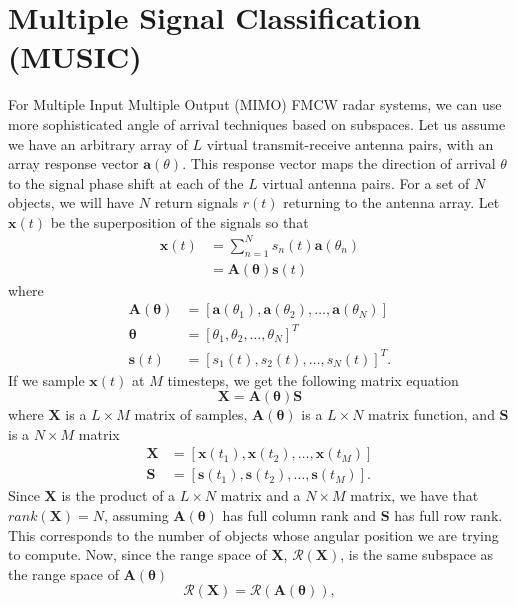 \section{Multiple Signal Classification (MUSIC)}
For Multiple Input Multiple Output (MIMO) FMCW radar systems, we can use more
sophisticated angle of arrival techniques based on subspaces. Let
us assume we have an arbitrary array of $L$ virtual transmit-receive antenna pairs, with an
array response vector $\bm{a}(\theta)$. This response vector maps the direction
of arrival $\theta$ to the signal phase shift at each of the $L$ virtual antenna
pairs. For a set of $N$ objects, we will have $N$ return signals $r(t)$
returning to the antenna array. Let $\bm{x}(t)$ be the superposition of the
signals so that \cite{bresler2017hilbert}
\begin{align}
	\bm{x}(t) &= \sum_{n=1}^N s_n(t) \bm{a}(\theta_n)\\
	&= \bm{A}(\bm{\theta})\bm{s}(t)
\end{align}
where
\begin{align}
	\bm{A}(\bm{\theta}) &= [\bm{a}(\theta_1), \bm{a}(\theta_2), \dots, \bm{a}(\theta_N)]\\
	\bm{\theta} &= [\theta_1, \theta_2, \dots, \theta_N]^T\\
	\bm{s}(t) &= [s_1(t), s_2(t), \dots, s_N(t)]^T.
\end{align}
If we sample $\bm{x}(t)$ at $M$ timesteps, we get the following matrix equation
\begin{equation}
	\bm{X} = \bm{A}(\bm{\theta})\bm{S}
\end{equation}
where $\bm{X}$ is a $L \times M$ matrix of samples, $\bm{A}(\bm{\theta})$ is a
$L\times N$ matrix function, and $\bm{S}$ is a $N\times M$ matrix
\begin{align}
	\bm{X} &= [\bm{x}(t_1), \bm{x}(t_2), \dots, \bm{x}(t_M)]\\
	\bm{S} &= [\bm{s}(t_1), \bm{s}(t_2), \dots, \bm{s}(t_M)].
\end{align}
Since $\bm{X}$ is the product of a $L\times N$ matrix and a $N\times M$ matrix,
we have that $rank(\bm{X}) = N$, assuming $\bm{A}(\bm{\theta})$ has full column
rank and $\bm{S}$ has full row rank. This corresponds to the number of objects
whose angular position we are trying to compute. Now, since the range space of
$\bm{X}$, $\mathcal{R}(\bm{X})$, is the same subspace as the range space of
$\bm{A}(\bm{\theta})$
\begin{equation}
	\mathcal{R}(\bm{X}) = \mathcal{R}(\bm{A}(\bm{\theta})),
\end{equation}
